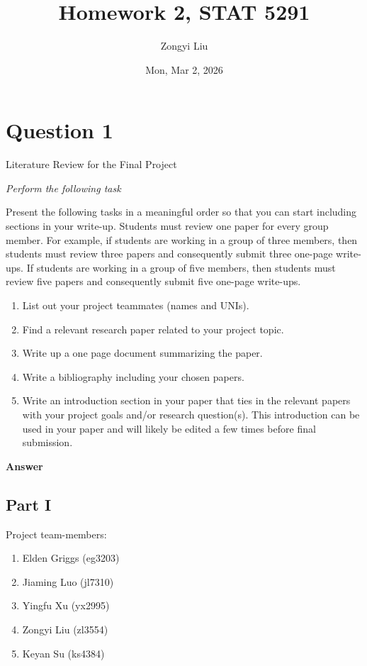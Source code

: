\documentclass[letterpaper]{article}
\title{Homework 2, STAT 5291}
\author{Zongyi Liu}
\date{Mon, Mar 2, 2026}
\begin{document}
		\maketitle
		
		\section{Question 1}
		
		{\color{deepred} Literature Review for the Final Project}
		
		
		\emph{Perform the following task}
		
		Present the following tasks in a meaningful order so that you can start including sections in your write-up. Students must review one paper for every group member. For example, if students are working in a group of three members, then students must review three papers and consequently submit three one-page write-ups. If students are working in a group of five members, then students must review five papers and consequently submit five one-page write-ups.
		
		\begin{enumerate}
			\item[i] List out your project teammates (names and UNIs).
			
			\item[ii] Find a relevant research paper related to your project topic.
			
			\item[iii] Write up a one page document summarizing the paper.
			
			\item[iv] Write a bibliography including your chosen papers.
			
			\item[v] Write an introduction section in your paper that ties in the relevant papers with your project goals and/or research question(s). This introduction can be used in your paper and will likely be edited a few times before final submission.
		\end{enumerate}
		
		\textbf{Answer}
		
		\subsection{Part I}
		
		Project team-members:
		
		\begin{enumerate}
			\item Elden Griggs (eg3203)
			\item Jiaming Luo (jl7310)
			\item Yingfu Xu (yx2995)
			\item Zongyi Liu (zl3554)
			\item Keyan Su (ks4384)
			
		\end{enumerate}
	
\end{document}
